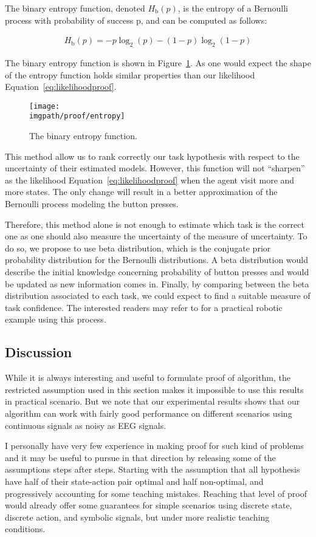 The binary entropy function, denoted $H_{\mathrm b}(p)$, is the entropy of a Bernoulli process with probability of success p, and can be computed as follows:

\begin{eqnarray}
H_{\mathrm b}(p) = -p\log_2(p) - (1-p)\log_2(1-p) 
\label{eq:likelihoodentropy}
\end{eqnarray}

The binary entropy function is shown in Figure~\ref{fig:prooflikelihoodentropy}. As one would expect the shape of the entropy function holds similar properties than our likelihood Equation~\ref{eq:likelihoodproof}.
    
\begin{figure}[!htbp]
\centering
\texttt{[image: \\imgpath/proof/entropy]}
\caption{The binary entropy function.}
\label{fig:prooflikelihoodentropy}
\end{figure}

This method allow us to rank correctly our task hypothesis with respect to the uncertainty of their estimated models. However, this function will not ``sharpen'' as the likelihood Equation~\ref{eq:likelihoodproof} when the agent visit more and more states. The only change will result in a better approximation of the Bernoulli process modeling the button presses.

Therefore, this method alone is not enough to estimate which task is the correct one as one should also measure the uncertainty of the measure of uncertainty. To do so, we propose to use beta distribution, which is the conjugate prior probability distribution for the Bernoulli distributions. A beta distribution would describe the initial knowledge concerning probability of button presses and would be updated as new information comes in. Finally, by comparing between the beta distribution associated to each task, we could expect to find a suitable measure of task confidence. The interested readers may refer to \cite{montesano2012active} for a practical robotic example using this process.

\subsection{Discussion}

While it is always interesting and useful to formulate proof of algorithm, the restricted assumption used in this section makes it impossible to use this results in practical scenario. But we note that our experimental results shows that our algorithm can work with fairly good performance on different scenarios using continuous signals as noisy as EEG signals.

I personally have very few experience in making proof for such kind of problems and it may be useful to pursue in that direction by releasing some of the assumptions steps after steps. Starting with the assumption that all hypothesis have half of their state-action pair optimal and half non-optimal, and progressively accounting for some teaching mistakes. Reaching that level of proof would already offer some guarantees for simple scenarios using discrete state, discrete action, and symbolic signals, but under more realistic teaching conditions.
